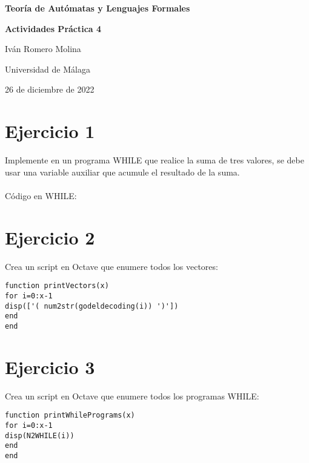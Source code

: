 \documentclass[16]{article} %
\begin{document}
\begin{titlepage} %
	\centering  %
	{\bfseries\Huge Teoría de Autómatas y Lenguajes Formales\par}
   	\vspace{2cm} %
    {\bfseries\huge Actividades Práctica 4\par}
    \vfill %
    {\huge Iván Romero Molina\par}
    \vspace{1cm}
    {\Large Universidad de Málaga\par}
    \vspace{1cm}
    {\large 26 de diciembre de 2022\par}
\end{titlepage}
    
\newpage
\section*{Ejercicio 1}
\noindent
Implemente en un programa WHILE que realice la suma de tres valores, se debe usar una variable auxiliar que acumule el resultado de la suma.\\\\
Código en WHILE:
\section*{Ejercicio 2}
\noindent
Crea un script en Octave que enumere todos los vectores:
\begin{lstlisting}
function printVectors(x)
for i=0:x-1
disp(['( num2str(godeldecoding(i)) ')'])
end
end
\end{lstlisting}
\section*{Ejercicio 3}
\noindent
Crea un script en Octave que enumere todos los programas WHILE:
\begin{lstlisting}
function printWhilePrograms(x)
for i=0:x-1
disp(N2WHILE(i))
end
end
\end{lstlisting}
\end{document}
